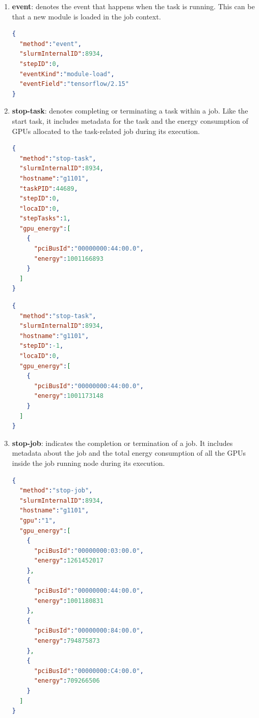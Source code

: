 \begin{enumerate}
    \item \textbf{event}: denotes the event that happens when the task is running. This can be that a new module is loaded in the job context.

\begin{lstlisting}[language=JSON]
{
  "method":"event",
  "slurmInternalID":8934,
  "stepID":0,
  "eventKind":"module-load",
  "eventField":"tensorflow/2.15"
}

\end{lstlisting}

    \item \textbf{stop-task}: denotes completing or terminating a task within a job. Like the start task, it includes metadata for the task and the energy consumption of GPUs allocated to the task-related job during its execution.

\begin{lstlisting}[language=JSON]
{
  "method":"stop-task",
  "slurmInternalID":8934,
  "hostname":"g1101",
  "taskPID":44689,
  "stepID":0,
  "locaID":0,
  "stepTasks":1,
  "gpu_energy":[
    {
      "pciBusId":"00000000:44:00.0",
      "energy":1001166893
    }
  ]
}
\end{lstlisting}

\begin{lstlisting}[language=JSON]
{
  "method":"stop-task",
  "slurmInternalID":8934,
  "hostname":"g1101",
  "stepID":-1,
  "locaID":0,
  "gpu_energy":[
    {
      "pciBusId":"00000000:44:00.0",
      "energy":1001173148
    }
  ]
}
\end{lstlisting}

    \item \textbf{stop-job}: indicates the completion or termination of a job. It includes metadata about the job and the total energy consumption of all the GPUs inside the job running node during its execution.

\clearpage

\begin{lstlisting}[language=JSON]
{
  "method":"stop-job",
  "slurmInternalID":8934,
  "hostname":"g1101",
  "gpu":"1",
  "gpu_energy":[
    {
      "pciBusId":"00000000:03:00.0",
      "energy":1261452017
    },
    {
      "pciBusId":"00000000:44:00.0",
      "energy":1001180831
    },
    {
      "pciBusId":"00000000:84:00.0",
      "energy":794875873
    },
    {
      "pciBusId":"00000000:C4:00.0",
      "energy":709266506
    }
  ]
}
\end{lstlisting}

\end{enumerate}

